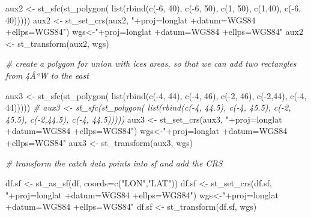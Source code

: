 \documentclass[
]{book}
\newenvironment{Shaded}{\begin{snugshade}}{\end{snugshade}}
\newcommand{\AttributeTok}[1]{\textcolor[rgb]{0.77,0.63,0.00}{#1}}
\newcommand{\CommentTok}[1]{\textcolor[rgb]{0.56,0.35,0.01}{\textit{#1}}}
\newcommand{\DecValTok}[1]{\textcolor[rgb]{0.00,0.00,0.81}{#1}}
\newcommand{\FunctionTok}[1]{\textcolor[rgb]{0.00,0.00,0.00}{#1}}
\newcommand{\NormalTok}[1]{#1}
\newcommand{\OtherTok}[1]{\textcolor[rgb]{0.56,0.35,0.01}{#1}}
\newcommand{\SpecialCharTok}[1]{\textcolor[rgb]{0.00,0.00,0.00}{#1}}
\newcommand{\StringTok}[1]{\textcolor[rgb]{0.31,0.60,0.02}{#1}}
\begin{document}
\begin{Shaded}
\begin{Highlighting}[]
\NormalTok{aux2 }\OtherTok{\textless{}{-}} \FunctionTok{st\_sfc}\NormalTok{(}\FunctionTok{st\_polygon}\NormalTok{( }\FunctionTok{list}\NormalTok{(}\FunctionTok{rbind}\NormalTok{(}\FunctionTok{c}\NormalTok{(}\SpecialCharTok{{-}}\DecValTok{6}\NormalTok{, }\DecValTok{40}\NormalTok{), }\FunctionTok{c}\NormalTok{(}\SpecialCharTok{{-}}\DecValTok{6}\NormalTok{, }\DecValTok{50}\NormalTok{), }\FunctionTok{c}\NormalTok{(}\DecValTok{1}\NormalTok{, }\DecValTok{50}\NormalTok{), }\FunctionTok{c}\NormalTok{(}\DecValTok{1}\NormalTok{,}\DecValTok{40}\NormalTok{), }\FunctionTok{c}\NormalTok{(}\SpecialCharTok{{-}}\DecValTok{6}\NormalTok{, }\DecValTok{40}\NormalTok{)))))}
\NormalTok{aux2 }\OtherTok{\textless{}{-}} \FunctionTok{st\_set\_crs}\NormalTok{(aux2, }\StringTok{"+proj=longlat +datum=WGS84 +ellps=WGS84"}\NormalTok{) }
\NormalTok{wgs}\OtherTok{\textless{}{-}}\StringTok{"+proj=longlat +datum=WGS84 +ellps=WGS84"}
\NormalTok{aux2 }\OtherTok{\textless{}{-}} \FunctionTok{st\_transform}\NormalTok{(aux2, wgs) }

\CommentTok{\# create a polygon for union with ices areas, so that we can add two rectangles from 4ÂºW to the east}

\NormalTok{aux3 }\OtherTok{\textless{}{-}} \FunctionTok{st\_sfc}\NormalTok{(}\FunctionTok{st\_polygon}\NormalTok{( }\FunctionTok{list}\NormalTok{(}\FunctionTok{rbind}\NormalTok{(}\FunctionTok{c}\NormalTok{(}\SpecialCharTok{{-}}\DecValTok{4}\NormalTok{, }\DecValTok{44}\NormalTok{), }\FunctionTok{c}\NormalTok{(}\SpecialCharTok{{-}}\DecValTok{4}\NormalTok{, }\DecValTok{46}\NormalTok{), }\FunctionTok{c}\NormalTok{(}\SpecialCharTok{{-}}\DecValTok{2}\NormalTok{, }\DecValTok{46}\NormalTok{), }\FunctionTok{c}\NormalTok{(}\SpecialCharTok{{-}}\DecValTok{2}\NormalTok{,}\DecValTok{44}\NormalTok{), }\FunctionTok{c}\NormalTok{(}\SpecialCharTok{{-}}\DecValTok{4}\NormalTok{, }\DecValTok{44}\NormalTok{)))))}
\CommentTok{\# aux3 \textless{}{-} st\_sfc(st\_polygon( list(rbind(c({-}4, 44.5), c({-}4, 45.5), c({-}2, 45.5), c({-}2,44.5), c({-}4, 44.5)))))}
\NormalTok{aux3 }\OtherTok{\textless{}{-}} \FunctionTok{st\_set\_crs}\NormalTok{(aux3, }\StringTok{"+proj=longlat +datum=WGS84 +ellps=WGS84"}\NormalTok{) }
\NormalTok{wgs}\OtherTok{\textless{}{-}}\StringTok{"+proj=longlat +datum=WGS84 +ellps=WGS84"}
\NormalTok{aux3 }\OtherTok{\textless{}{-}} \FunctionTok{st\_transform}\NormalTok{(aux3, wgs) }

\CommentTok{\# transform the catch data points into sf and add the CRS}

\NormalTok{df.sf }\OtherTok{\textless{}{-}} \FunctionTok{st\_as\_sf}\NormalTok{(df, }\AttributeTok{coords=}\FunctionTok{c}\NormalTok{(}\StringTok{"LON"}\NormalTok{,}\StringTok{"LAT"}\NormalTok{))}
\NormalTok{df.sf }\OtherTok{\textless{}{-}} \FunctionTok{st\_set\_crs}\NormalTok{(df.sf, }\StringTok{"+proj=longlat +datum=WGS84 +ellps=WGS84"}\NormalTok{) }
\NormalTok{wgs}\OtherTok{\textless{}{-}}\StringTok{"+proj=longlat +datum=WGS84 +ellps=WGS84"}
\NormalTok{df.sf }\OtherTok{\textless{}{-}} \FunctionTok{st\_transform}\NormalTok{(df.sf, wgs) }


\end{Highlighting}
\end{Shaded}
\end{document}
